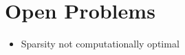\documentclass[12pt,fleqn,twocolumn]{article}
\begin{document}
\cite{Tanaka2020PruningNN}
\cite{Zhang2021EfficientLT}

\section*{Open Problems}%
\label{sec:Open Problems}
\begin{itemize}
    \item Sparsity not computationally optimal
\end{itemize}

\clearpage
\renewcommand*{\bibfont}{\normalfont\footnotesize}
\printbibliography[heading=bibintoc]

\printglossary[type=\acronymtype]
\end{document}
